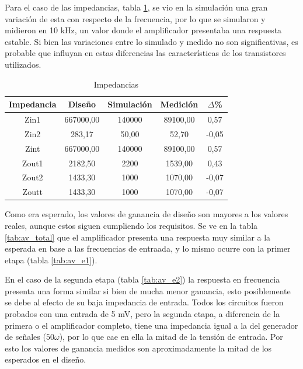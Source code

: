 Para el caso de las impedancias, tabla \ref{tab:impedancias}, se vio en la simulación una gran variación de esta con respecto de la frecuencia, por lo que se simularon y midieron en 10 kHz, un valor donde el amplificador presentaba una respuesta estable. Si bien las variaciones entre lo simulado y medido no son significativas, es probable que influyan en estas diferencias las características de los transistores utilizados.

\begin{table}[H]
\centering
\begin{tabular}{|c|c|c|c|c|}
\hline
\textbf{Impedancia} & \textbf{Diseño} & \textbf{Simulación} & \textbf{Medición} & \textbf{$\Delta$\%} \\ \hline
Zin1 & 667000,00 & 140000 & 89100,00 & 0,57 \\ \hline
Zin2 & 283,17    & 50,00  & 52,70    & -0,05 \\ \hline
Zint & 667000,00 & 140000 & 89100,00 & 0,57 \\ \hline
Zout1 & 2182,50  & 2200   & 1539,00  & 0,43 \\ \hline
Zout2 & 1433,30  & 1000   & 1070,00  & -0,07 \\ \hline
Zoutt & 1433,30  & 1000   & 1070,00  & -0,07 \\ \hline
\end{tabular}
\caption{Impedancias }
\label{tab:impedancias}
\end{table}

Como era esperado, los valores de ganancia de diseño son mayores a los valores reales, aunque estos siguen cumpliendo los requisitos. Se ve en la tabla \ref{tab:av_total} que el amplificador presenta una respuesta muy similar a la esperada en base a las frecuencias de entraada, y lo mismo ocurre con la primer etapa (tabla \ref{tab:av_e1}). 

En el caso de la segunda etapa (tabla \ref{tab:av_e2}) la respuesta en frecuencia presenta una forma similar si bien de mucha menor ganancia, esto posiblemente se debe al efecto de su baja impedancia de entrada. Todos los circuitos fueron probados con una entrada de 5 mV, pero la segunda etapa, a diferencia de la primera o el amplificador completo, tiene una impedancia igual a la del generador de señales ($50 \omega$), por lo que cae en ella la mitad de la tensión de entrada. Por esto los valores de ganancia medidos son aproximadamente la mitad de los esperados en el diseño.

